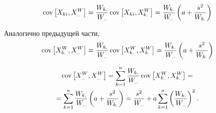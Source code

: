 \partsol{}
\begin{equation}
    \operatorname*{cov}\left[X_{ki}, X_{..}^W\right] = \frac{W_{k.}}{W_{..}}\operatorname*{cov}\left[X_{ki}, X_{k.}^W\right] =   \frac{W_{k.}}{W_{..}}\left(a+\frac{s^2}{W_{k.}}\right)
\end{equation}

\partsol{}Аналогично предыдущей части,
\begin{equation}
    \operatorname*{cov}\left[X_{k.}^W, X_{..}^W\right] = \frac{W_{k.}}{W_{..}}\operatorname*{cov}\left[X_{k.}^W, X_{k.}^W\right] =   \frac{W_{k.}}{W_{..}}\left(a+\frac{s^2}{W_{k.}}\right)
\end{equation}

\partsol{}
\begin{multline}
    \operatorname*{cov}\left[X_{..}^W, X_{..}^W\right] = \sum_{k=1}^n\frac{W_{k.}}{W_{..}}\operatorname*{cov}\left[X_{k.}^W, X_{k.}^W\right] =\\= \sum_{k=1}^n\frac{W_{k.}}{W_{..}}\left(a+\frac{s^2}{W_{k.}}\right) = \frac{s^2}{W_{..}}+a\sum_{k=1}^n\left(\frac{W_{k.}}{W_{..}}\right)^2.
\end{multline}